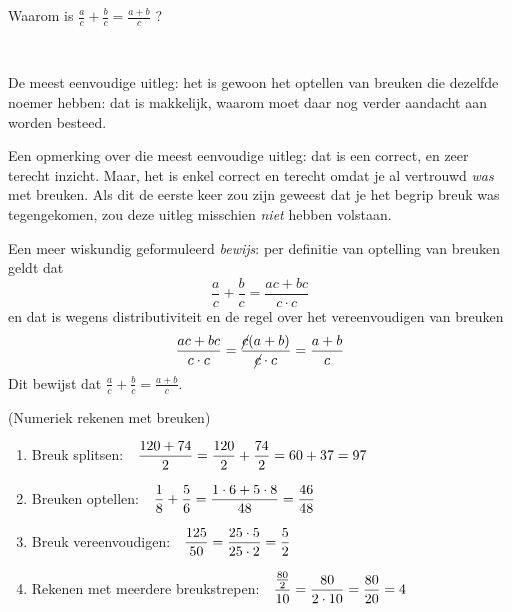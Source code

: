 \documentclass[numbers]{ximera}
\begin{document}
\begin{uitweiding}
	Waarom is $\frac{a}{c}+\frac{b}{c} = \frac{a+b}{c}$ ?
	\begin{expandable}
	\begin{explanation} \ 
		
		De meest eenvoudige uitleg: het is gewoon het optellen van breuken die dezelfde noemer hebben: dat is makkelijk, waarom moet daar nog verder aandacht aan worden besteed.
		
		Een opmerking over die meest eenvoudige uitleg: dat is een correct, en zeer terecht inzicht. Maar, het is enkel correct en terecht omdat je al vertrouwd \textit{was} met breuken. Als dit de eerste keer zou zijn geweest dat je het begrip breuk was tegengekomen, zou deze uitleg misschien \textit{niet} hebben volstaan.		
		
		Een meer wiskundig geformuleerd \textit{bewijs}: per definitie van optelling van breuken geldt dat 
		$$ \frac{a}{c}+\frac{b}{c} = \frac{ac+bc}{c\cdot c}$$
		en dat is wegens distributiviteit en de regel over het vereenvoudigen van breuken
		$$ \frac{ac+bc}{c\cdot c} = \frac{\cancel{c}(a+b)}{\cancel{c} \cdot c} = \frac{a+b}{c}$$
		Dit bewijst dat $\frac{a}{c}+\frac{b}{c} = \frac{a+b}{c}$.
	\end{explanation}
	
\end{expandable}
\end{uitweiding}


\begin{example} (Numeriek rekenen met breuken)
	
	\begin{enumerate}
		\item Breuk splitsen:\ \ $\displaystyle{\frac{120+74}{2}=\frac{120}{2}+\frac{74}{2}=60+37=97}$
		\item Breuken optellen:\ \ $\displaystyle{\frac{1}{8}+\frac{5}{6}=\frac{1 \cdot 6+5 \cdot 8}{48}=\frac{46}{48}}$
		\item Breuk vereenvoudigen:\ \ $\displaystyle{\frac{125}{50}=\frac{25 \cdot 5}{25 \cdot 2}=\frac{5}{2}}$
		\item Rekenen met meerdere breukstrepen:\ \ $\displaystyle{\frac{\frac{80}{2}}{10}=\frac{80}{2\cdot10}=\frac{80}{20}=4}$
	\end{enumerate}
\end{example}
\end{document}
